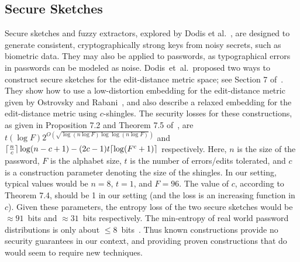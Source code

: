 \subsection{Secure Sketches}
\label{app:secsketch}
Secure sketches and fuzzy extractors, explored by Dodis et
al.~\cite{dodisetal:2004,1543961}, are designed to generate
consistent, cryptographically strong keys from noisy secrets, such as
biometric data. They may also be applied to passwords, as
typographical errors in passwords can be modeled as noise.
Dodis~et~al.~proposed two ways to construct secure sketches for the
edit-distance metric space; see Section 7
of~\cite{dodisetal:2004}. They show how to use a low-distortion
embedding for the edit-distance metric given by Ostrovsky and
Rabani~\cite{ostrovsky2007low}, and also describe a relaxed embedding
for the edit-distance metric using $c$-shingles. The security losses
for these constructions, as given in Proposition 7.2 and Theorem 7.5
of~\cite{dodisetal:2004}, are
$t(\log F)2^{O\left(\sqrt{\log(n\log F)\log\log(n\log F)}\right)}$ and
$\lceil{n\over c}\rceil\log(n-c+1)-(2c-1)t\lceil\log(F^c+1)\rceil$
respectively. Here, $n$ is the size of the password, $F$ is the
alphabet size, $t$ is the number of errors/edits tolerated, and $c$ is
a construction parameter denoting the size of the shingles. In our
setting, typical values would be $n=8$, $t=1$, and $F=96$. The value
of $c$, according to Theorem 7.4, should be 1 in our setting (and the
loss is an increasing function in $c$). Given these parameters, the
entropy loss of the two secure sketches would be $\approx 91$~bits and
$\approx 31$~bits respectively. The min-entropy of real world password
distributions is only about $\le 8$~bits~\cite{bonneau12}. Thus known
constructions provide no security guarantees in our context, and
providing proven constructions that do would seem to require new
techniques.




